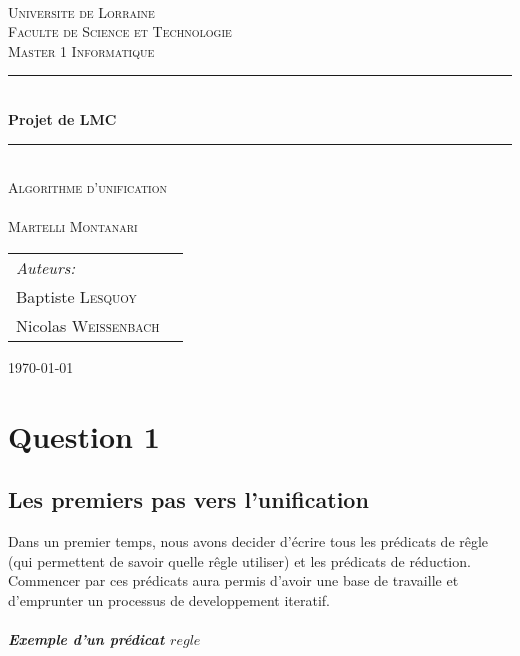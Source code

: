 \documentclass[10pt,a4paper]{report}
\newcommand{\HRule}{\rule{\linewidth}{1mm}}
\begin{document}
  \begin{titlepage}
    \begin{center}
      ~\\[4cm]
      \textsc{\LARGE Universite de Lorraine}\\[1.5cm]
      \textsc{\Large Faculte de Science et Technologie}\\[0.5cm]
      \textsc{\Large Master 1 Informatique}\\[0.5cm]
      \HRule \\[0.4cm]
      { \huge \bfseries Projet de LMC \\[0.4cm] }
      \HRule \\[1cm]
     \textsc{\LARGE Algorithme d'unification \\ ~ \\ Martelli Montanari }\\[1cm]
      \begin{tabular*}{\textwidth}{@{}l@{\extracolsep{\fill}}r@{}}
	\emph{Auteurs:}\\
	Baptiste \textsc{Lesquoy} \\
	Nicolas \textsc{Weissenbach}\\
      \end{tabular*}
      \vfill
      {\large \today}
    \end{center}
  \end{titlepage}

\chapter*{Question 1}

\section*{Les premiers pas vers l'unification}
Dans un premier temps, nous avons decider d'écrire tous les prédicats de rêgle (qui permettent de savoir quelle rêgle utiliser) et les prédicats de réduction. Commencer par ces prédicats aura permis d'avoir une base de travaille et d'emprunter un processus de developpement iteratif.

\paragraph{Exemple d'un prédicat $regle$} ~\\
\end{document}
